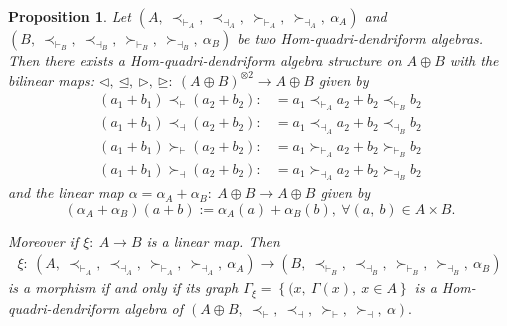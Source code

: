 \documentclass[11pt,twoside,reqno]{amsart}
\theoremstyle{plain}
\newtheorem{proposition}[thm]{Proposition}
\theoremstyle{definition}
\begin{document}
\begin{proposition}
Let $(A ,\ \prec_{\vdash_{A}},\  \prec_{\dashv_{A}} ,\ \succ_{\vdash_{A}} ,\ \succ_{\dashv_{A}},\  \alpha_{A})$ and $(B  ,\ \prec_{\vdash_{B}},\  \prec_{\dashv_{B}},\  \succ_{\vdash_{B}} ,\ \succ_{\dashv_{B}} ,\ \alpha_{B})$ be two Hom-quadri-dendriform algebras. Then  there exists a Hom-quadri-dendriform algebra structure on $A\oplus B$ with the bilinear maps:
$\lhd , \  \unlhd,\  \rhd,\  \unrhd : \ (A\oplus B)^{\otimes2}\longrightarrow A\oplus B$ given by  
\begin{align*}
 (a_1+b_1)\prec_\vdash(a_2+b_2):&=a_1\prec_{\vdash_{A}}a_2+b_2\prec_{\vdash_{B}}b_2 \\
  (a_1+b_1)\prec_\dashv(a_2+b_2):&=a_1\prec_{\dashv_{A}}a_2+b_2\prec_{\dashv_{B}}b_2 \\
	(a_1+b_1)\succ_\vdash(a_2+b_2):&=a_1\succ_{\vdash_{A}}a_2+b_2\succ_{\vdash_{B}}b_2 \\
  (a_1+b_1)\succ_\dashv(a_2+b_2):&=a_1\succ_{\dashv_{A}}a_2+b_2\succ_{\dashv_{B}}b_2 
\end{align*}
and the linear map
 $\alpha=\alpha_A+\alpha_B :\ A\oplus B\longrightarrow A\oplus B$ given by \\
$$(\alpha_A+\alpha_B)(a+b):=\alpha_A(a)+\alpha_B(b)   ,\ \forall(a,\ b)\in A\times B.$$

Moreover  if $\xi : \ A\longrightarrow B$ is a linear map. Then  
\begin{align*}
 \xi  : \ (A ,\ \prec_{\vdash_{A}},\  \prec_{\dashv_{A}},\  \succ_{\vdash_{A}},\  \succ_{\dashv_{A}} ,\ \alpha_{A})\longrightarrow(B  ,\ \prec_{\vdash_{B}} ,\ \prec_{\dashv_{B}},\  \succ_{\vdash_{B}},\  \succ_{\dashv_{B}} ,\ \alpha_{B})
\end{align*}
is a morphism if and only if its graph $\Gamma_\xi=\left\{(x  ,\ \Gamma(x) ,\ x\in A\right\}$ is a Hom-quadri-dendriform algebra of 
$(A\oplus B,\  \prec_\vdash ,\  \prec_\dashv  ,\ \succ_\vdash,  \ \succ_\dashv ,\ \alpha).$
\end{proposition}
\end{document}
